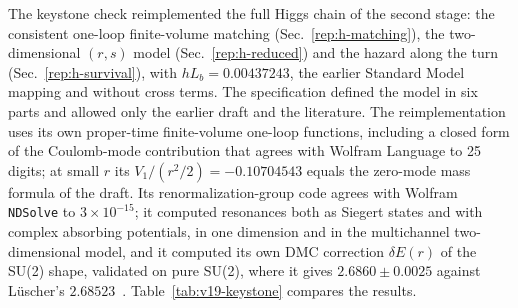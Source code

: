 The keystone check reimplemented the full Higgs chain of the second stage: the consistent one-loop finite-volume matching (Sec.~\ref{rep:h-matching}), the two-dimensional $(r,s)$ model (Sec.~\ref{rep:h-reduced}) and the hazard along the turn (Sec.~\ref{rep:h-survival}), with $hL_b=0.00437243$, the earlier Standard Model mapping and without cross terms. %
The specification defined the model in six parts and allowed only the earlier draft and the literature.
The reimplementation uses its own proper-time finite-volume one-loop functions, including a closed form of the Coulomb-mode contribution that agrees with Wolfram Language to 25 digits; at small $r$ its $V_1/(r^2/2)=-0.10704543$ equals the zero-mode mass formula of the draft. %
Its renormalization-group code agrees with Wolfram \texttt{NDSolve} to $3\times10^{-15}$; it computed resonances both as Siegert states and with complex absorbing potentials, in one dimension and in the multichannel two-dimensional model, and it computed its own DMC correction $\delta E(r)$ of the SU(2) shape, validated on pure SU(2), where it gives $2.6860\pm0.0025$ against L\"uscher's $2.68523$~\cite{Luscher:1982ma}. %
Table~\ref{tab:v19-keystone} compares the results.

